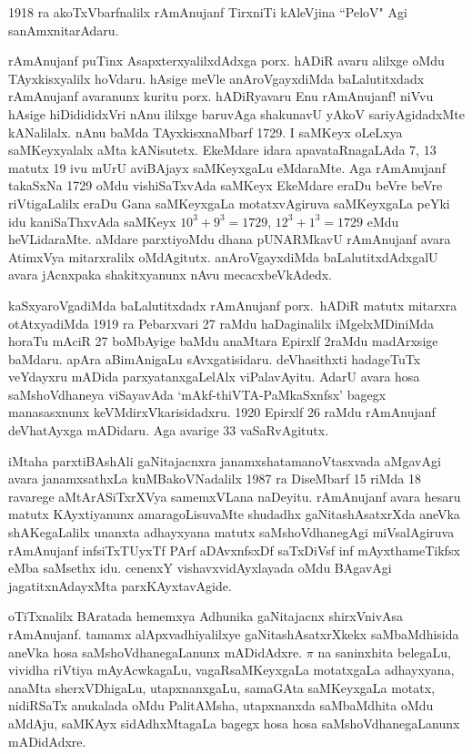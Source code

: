 {\rm 1918} ra akoTxVbarfnalilx rAmAnujanf TirxniTi kAleVjina ``PeloV" Agi sanAmxnitarAdaru.

rAmAnujanf puTinx AsapxterxyalilxdAdxga porx. hADiR avaru alilxge oMdu TAyxkisx\-yalilx hoVdaru. hAsige meVle anAroVgayxdiMda baLalutitxdadx rAmAnujanf avaranunx kuritu porx. hADiRyavaru Enu rAmAnujanf! niVvu hAsige hiDidididxVri nAnu ililxge baruvAga shakunavU yAkoV sariyAgidadxMte kANalilalx. nAnu baMda TAyxkisx\break naMbarf {\rm 1729.} I saMKeyx oLeLxya saMKeyxyalalx aMta kANisutetx. EkeMdare idara apavataRnagaLAda {\rm 7, 13} matutx {\rm 19} ivu mUrU aviBAjayx saMKeyxgaLu eMdaraMte. Aga rAmAnujanf takaSxNa {\rm 1729} oMdu vishiSaTxvAda saMKeyx EkeMdare eraDu beVre beVre riVtigaLalilx eraDu Gana saMKeyxgaLa motatxvAgiruva saMKeyxgaLa peYki idu kaniSaThxvAda saMKeyx $10^{3}+9^{3}=1729$, $12^{3}+1^{3}=1729$ eMdu heVLidaraMte. aMdare parxtiyoMdu dhana pUNARMkavU rAmAnujanf avara AtimxVya mitarxralilx oMdAgitutx. anAroVgayxdiMda baLalutitxdAdxgalU avara jAcnxpaka shakitxyanunx nAvu mecacxbeVkAdedx.

kaSxyaroVgadiMda baLalutitxdadx rAmAnujanf porx.~hADiR matutx mitarxra otAtxyadiMda {\rm 1919} ra Pebarxvari {\rm 27} raMdu haDaginalilx iMgelxMDiniMda horaTu mAciR {\rm 27} boMbAyige baMdu anaMtara Epirxlf {\rm 2}raMdu madArxsige baMdaru. apAra aBimAnigaLu sAvxgatisidaru. deVhasithxti hadageTuTx veYdayxru mADida parxyatanx\-gaLelAlx viPalavAyitu. AdarU avara hosa saMshoVdhaneya viSayavAda `mAkf-thiVTA-PaMkaSxnfsx' bagegx manasasxnunx keVMdirxVkarisidadxru. {\rm 1920} Epirxlf {\rm 26} raMdu rAmAnujanf deVhatAyxga mADidaru. Aga avarige {\rm 33} vaSaRvAgitutx.
\newpage

iMtaha parxtiBAshAli gaNitajacnxra janamxshatamanoVtasxvada aMgavAgi avara janamxsathxLa kuMBakoVNadalilx {\rm 1987} ra DiseMbarf {\rm 15} riMda {\rm 18} ravarege aMtArASiTxrXVya samemxVLana naDeyitu. rAmAnujanf avara hesaru matutx KAyxtiyanunx amaragoLisuvaMte shudadhx gaNitashAsatxrXda aneVka shAKegaLalilx unanxta adhayxyana matutx saMshoVdhanegAgi miVsalAgiruva rAmAnujanf infsiTxTUyxTf PArf aDAvxnfsxDf saTxDiVsf inf mAyxthameTikfsx eMba saMsethx idu. cenenxY vishavxvidAyxlayada oMdu BAgavAgi jagatitxnA\-dayxMta parxKAyxtavAgide.
\vskip 0.1cm

oTiTxnalilx BAratada hememxya Adhunika gaNitajacnx shirxVnivAsa rAmAnujanf. tamamx alApxvadhiyalilxye gaNitashAsatxrXkekx saMbaMdhisida aneVka hosa saMshoVdhanegaLanunx mADidAdxre. $\pi$ na saninxhita belegaLu, vividha riVtiya mAyAcwkagaLu, vagaRsaMKeyxgaLa motatxgaLa adhayxyana, anaMta sherxVDhigaLu, utapxnanxgaLu, samaGAta saMKeyxgaLa motatx, nidiRSaTx anukalada oMdu PalitAMsha, utapxnanxda saMbaMdhita oMdu aMdAju, saMKAyx sidAdhxMtagaLa bagegx hosa hosa saMshoVdhanegaLanunx mADidAdxre.
\vskip 0.1cm

